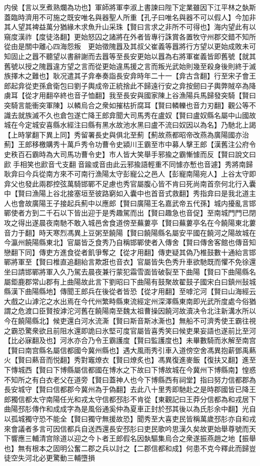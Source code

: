 内侯【言以烹煮熟爛為功也】軍師將軍李淑上書諫曰陛下定業雖因下江平林之埶斯蓋臨時濟用不可施之既安唯名與器聖人所重【孔子曰唯名與器不可以假人】今加非其人望其裨益萬分猶緣木求魚升山采珠【賢曰言求之非所不可得也】海内望此有以窺度漢祚【度徒洛翻】更始怒囚之諸將在外者皆專行誅賞各置牧守州郡交錯不知所從由是關中離心四海怨叛　更始徵隗囂及其叔父崔義等囂將行方望以更始成敗未可知固止之囂不聽望以書辭謝而去囂等至長安更始以囂為右將軍崔義皆即舊號【就其舊號以授之隗囂違方望之言而從更始違馬援之言而叛光武始則幾至殺身後則終于滅族擇木之難也】耿况遣其子弇奉奏詣長安弇時年二十一【弇古含翻】行至宋子會王郎起弇從吏孫倉衛包曰劉子輿成帝正統捨此不歸遠行安之弇按劒曰子輿弊賊卒為降虜耳【從才用翻卒終也音子恤翻】我至長安與國家陳上谷漁陽兵馬歸發突騎【賢曰突騎言能衝突軍陳】以轔烏合之衆如摧枯折腐耳【賢曰轔轢也音力刃翻】觀公等不識去就族滅不久也倉包遂亡降王郎弇聞大司馬秀在盧奴【賢曰盧奴縣名屬中山國故城在今定城安喜縣水經注曰縣有黑水故池水黑曰盧不流曰奴因以為名】乃馳北上謁【上時掌翻下異上同】秀留署長史與俱北至薊【薊故燕都昭帝改燕為廣陽國亦治薊】王郎移檄購秀十萬戶秀令功曹令史潁川王霸至市中募人擊王郎【漢舊注公府令史秩百石霸時為大司馬功曹令史】市人皆大笑舉手邪揄之霸慚懅而反【賢曰說文曰歋手相笑也歋音弋支翻音踰或音由此云邪揄語輕重不同懅亦慙也音遽】秀將南歸耿弇曰今兵從南方來不可南行漁陽太守彭寵公之邑人【彭寵南陽宛人】上谷太守即弇父也發此兩郡控弦萬騎邯鄲不足慮也秀官屬腹心皆不肯曰死尚南首奈何北行入囊中【賢曰漁陽上谷北接塞垣至彼路窮如入囊中也首音式救翻】秀指弇曰是我北道主人也會故廣陽王子接起兵薊中以應郎【賢曰廣陽王名嘉武帝五代孫】城内擾亂言邯鄲使者方到二千石以下皆出迎于是秀趣駕而出【賢曰趣急也音促】至南城門門已閉攻之得出遂晨夜南馳不敢入城邑舍食道傍至蕪蔞亭【賢曰蕪蔞亭名在今饒陽東北蔞音力于翻】時天寒烈馮異上豆粥至饒陽【賢曰饒陽縣名屬安平國在饒河之陽故城在今瀛州饒陽縣東北】官屬皆乏食秀乃自稱邯鄲使者入傳舍【賢曰傳舍客館也傳音知戀翻下同】傳吏方進食從者飢爭奪之【從才用翻】傳吏疑其偽乃椎鼓數十通紿言邯鄲將軍至【賢曰椎直追翻紿言欺誑也音衣】官屬皆失色秀升車欲馳既而懼不免徐還坐曰請邯鄲將軍入久乃駕去晨夜兼行蒙犯霜雪面皆破裂至下曲陽【賢曰下曲陽縣名屬鉅鹿郡常山郡有上曲陽故此言下劉昭曰下曲陽有鼓聚故翟鼓子國宋白曰鎮州鼔城縣漢下曲陽縣地】傳聞王郎兵在後從者皆恐【從才用翻】至嘑沱河【賢曰山海經云大戲之山滹沱之水出焉在今代州繁畤縣東流經定州深澤縣東南即光武所度處今俗猶謂之危渡口臣賢按滹沱河舊在饒陽南至魏太祖曹操因饒河故瀆决令北注新溝水所以今在饒陽縣北】候吏還白河水流澌【賢曰斯音斯冰澌也】無船不可濟秀使王霸往視之霸恐驚衆欲且前阻水還即詭曰氷堅可度官屬皆喜秀笑曰候吏果妄語也遂前比至河【比必寐翻及也】河氷亦合乃令王霸護度【賢曰監護度也】未畢數騎而氷解至南宫【賢曰南宫縣名屬信都國今冀州縣也】遇大風雨秀引車入道傍空舍馮異抱薪鄧禹爇火【賢曰爇音而悦翻】秀對竈燎衣【賢曰燎炙也】馮異復進麥飯【復扶又翻】進至下慱城西【賢曰下博縣屬信都國在博水之下故曰下博故城在今冀州下博縣南】惶惑不知所之有白衣老父在道旁【賢曰蓋神人也今下博縣西有祠堂】指曰努力信都郡為長安城守【賢曰信都郡今冀州為于偽翻】去此八十里秀即馳赴之是時郡國皆已降王郎獨信都太守南陽任光和戎太守信都邳肜不肯從【東觀記曰王莽分信都為和戎居下曲陽邳肜傳作和成成字為是風俗通奚仲為夏車正封於邳其後以為氏肜余中翻】光自以孤城獨守恐不能全【賢曰獨守無援故恐】聞秀至大喜吏民皆稱萬歲邳肜亦自和戎來會議者多言可因信都兵自送西還長安邳肜曰吏民歌吟思漢久矣故更始舉尊號而天下響應三輔清宫除道以迎之今卜者王郎假名因埶驅集烏合之衆遂振燕趙之地【振舉也】無有根本之固明公奮二郡之兵以討之【二郡信都和成】何患不克今釋此而歸豈徒空失河北必更驚動三輔墮損